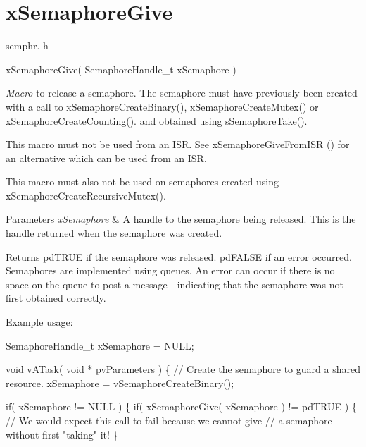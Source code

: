 \hypertarget{group__xSemaphoreGive}{}\section{x\+Semaphore\+Give}
\label{group__xSemaphoreGive}
semphr. h 
\begin{DoxyPre}xSemaphoreGive( SemaphoreHandle\_t xSemaphore )\end{DoxyPre}


{\itshape Macro} to release a semaphore. The semaphore must have previously been created with a call to x\+Semaphore\+Create\+Binary(), x\+Semaphore\+Create\+Mutex() or x\+Semaphore\+Create\+Counting(). and obtained using s\+Semaphore\+Take().

This macro must not be used from an I\+SR. See x\+Semaphore\+Give\+From\+I\+SR () for an alternative which can be used from an I\+SR.

This macro must also not be used on semaphores created using x\+Semaphore\+Create\+Recursive\+Mutex().


\begin{DoxyParams}{Parameters}
{\em x\+Semaphore} & A handle to the semaphore being released. This is the handle returned when the semaphore was created.\\
\hline
\end{DoxyParams}
\begin{DoxyReturn}{Returns}
pd\+T\+R\+UE if the semaphore was released. pd\+F\+A\+L\+SE if an error occurred. Semaphores are implemented using queues. An error can occur if there is no space on the queue to post a message -\/ indicating that the semaphore was not first obtained correctly.
\end{DoxyReturn}
Example usage\+: 
\begin{DoxyPre}
SemaphoreHandle\_t xSemaphore = NULL;\end{DoxyPre}



\begin{DoxyPre}void vATask( void * pvParameters )
\{
   // Create the semaphore to guard a shared resource.
   xSemaphore = vSemaphoreCreateBinary();\end{DoxyPre}



\begin{DoxyPre}   if( xSemaphore != NULL )
   \{
       if( xSemaphoreGive( xSemaphore ) != pdTRUE )
       \{
           // We would expect this call to fail because we cannot give
           // a semaphore without first "taking" it!
       \}\end{DoxyPre}



